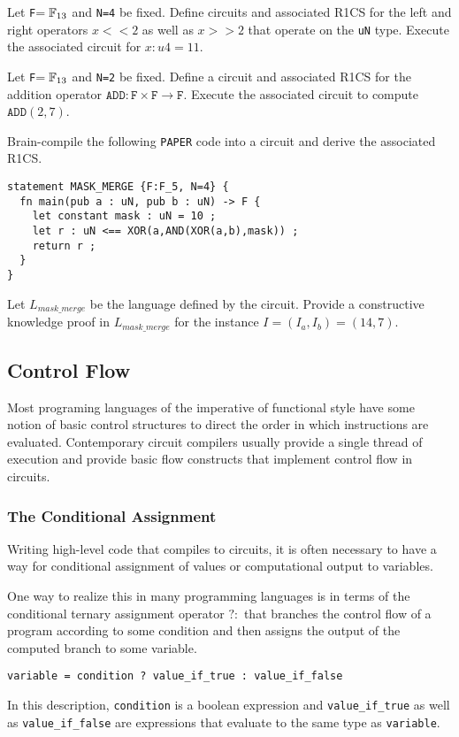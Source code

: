 \begin{exercise}
Let \texttt{F}$=\mathbb{F}_{13}$ and \texttt{N=4} be fixed. Define circuits and associated R1CS for the left and right  operators $x<<2$ as well as $x>>2$ that operate on the \texttt{uN} type. Execute the associated circuit for $x:u4 = 11$.
\end{exercise}
\begin{exercise}
Let \texttt{F}$=\mathbb{F}_{13}$ and \texttt{N=2} be fixed. Define a circuit and associated R1CS for the addition operator $\mathtt{ADD}: \mathtt{F} \times \mathtt{F} \to \mathtt{F}$. Execute the associated circuit to compute $\mathtt{ADD}(2,7)$.
\end{exercise}
\begin{exercise} Brain-compile the following \texttt{PAPER} code into a circuit and derive the associated R1CS. 
\begin{lstlisting}
statement MASK_MERGE {F:F_5, N=4} {
  fn main(pub a : uN, pub b : uN) -> F {
    let constant mask : uN = 10 ;
    let r : uN <== XOR(a,AND(XOR(a,b),mask)) ;
    return r ;
  }
}
\end{lstlisting}
Let $L_{mask\_merge}$ be the language defined by the circuit. Provide a constructive knowledge proof in $L_{mask\_merge}$ for the instance $I=(I_a, I_b) = (14, 7)$.
\end{exercise}
\subsection{Control Flow} Most programing languages of the imperative of functional style have some notion of basic control structures to direct the order in which instructions are evaluated. Contemporary circuit compilers usually provide a single thread of execution and provide basic flow constructs that implement control flow in circuits.
\subsubsection{The Conditional Assignment} Writing high-level code that compiles to circuits, it is often necessary to have a way for conditional assignment of values or computational output to variables.

One way to realize this in many programming languages is in terms of the conditional ternary assignment operator $?:$ that branches the control flow of a program according to some condition and then assigns the output of the computed branch to some variable. 
\begin{lstlisting}
variable = condition ? value_if_true : value_if_false  
\end{lstlisting}
In this description, \texttt{condition} is a boolean expression and \texttt{value\_if\_true} as well as \texttt{value\_if\_false} are expressions that evaluate to the same type as \texttt{variable}.

